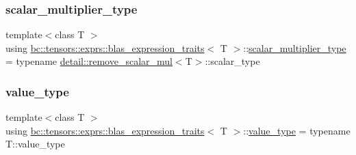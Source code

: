 \mbox{\label{structbc_1_1tensors_1_1exprs_1_1blas__expression__traits_aa755439956950b30c1f850ade614ef72}} 
\subsubsection{\texorpdfstring{scalar\+\_\+multiplier\+\_\+type}{scalar\_multiplier\_type}}
{\footnotesize\ttfamily template$<$class T $>$ \\
using \hyperlink{structbc_1_1tensors_1_1exprs_1_1blas__expression__traits}{bc\+::tensors\+::exprs\+::blas\+\_\+expression\+\_\+traits}$<$ T $>$\+::\hyperlink{structbc_1_1tensors_1_1exprs_1_1blas__expression__traits_aa755439956950b30c1f850ade614ef72}{scalar\+\_\+multiplier\+\_\+type} =  typename \hyperlink{structbc_1_1tensors_1_1exprs_1_1detail_1_1remove__scalar__mul}{detail\+::remove\+\_\+scalar\+\_\+mul}$<$T$>$\+::scalar\+\_\+type}

\mbox{\label{structbc_1_1tensors_1_1exprs_1_1blas__expression__traits_a9de7efe501aa96461f4ae6185762cad9}} 
\subsubsection{\texorpdfstring{value\+\_\+type}{value\_type}}
{\footnotesize\ttfamily template$<$class T $>$ \\
using \hyperlink{structbc_1_1tensors_1_1exprs_1_1blas__expression__traits}{bc\+::tensors\+::exprs\+::blas\+\_\+expression\+\_\+traits}$<$ T $>$\+::\hyperlink{structbc_1_1tensors_1_1exprs_1_1blas__expression__traits_a9de7efe501aa96461f4ae6185762cad9}{value\+\_\+type} =  typename T\+::value\+\_\+type}



